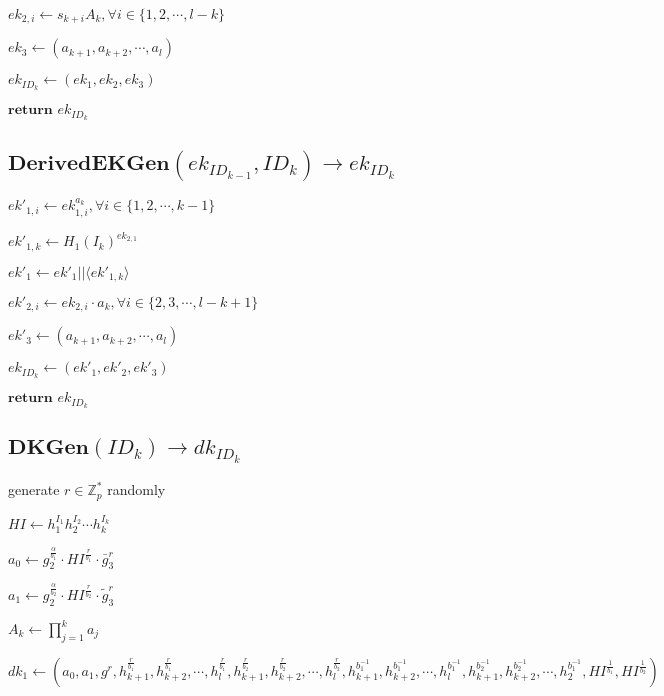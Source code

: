 \documentclass[a4paper]{article}
\begin{document}
$\textit{ek}_{2, i} \gets s_{k + i}A_k, \forall i \in \{1, 2, \cdots, l - k\}$

$\textit{ek}_3 \gets (a_{k + 1}, a_{k + 2}, \cdots, a_l)$

$\textit{ek}_{\textit{ID}_k} \gets (\textit{ek}_1, \textit{ek}_2, \textit{ek}_3)$

$\textbf{return }\textit{ek}_{\textit{ID}_k}$

\subsection{$\textbf{DerivedEKGen}(\textit{ek}_{\textit{ID}_{k - 1}}, \textit{ID}_k) \rightarrow \textit{ek}_{\textit{ID}_k}$}

$\textit{ek}'_{1, i} \gets \textit{ek}_{1, i}^{a_k}, \forall i \in \{1, 2, \cdots, k - 1\}$

$\textit{ek}'_{1, k} \gets H_1(I_k)^{\textit{ek}_{2, 1}}$

$\textit{ek}'_1 \gets \textit{ek}'_1 || \langle\textit{ek}'_{1, k}\rangle$

$\textit{ek}'_{2, i} \gets \textit{ek}_{2, i} \cdot a_k, \forall i \in \{2, 3, \cdots, l - k + 1\}$

$\textit{ek}'_3 \gets (a_{k + 1}, a_{k + 2}, \cdots, a_l)$

$\textit{ek}_{\textit{ID}_k} \gets (\textit{ek}'_1, \textit{ek}'_2, \textit{ek}'_3)$

$\textbf{return }\textit{ek}_{\textit{ID}_k}$

\subsection{$\textbf{DKGen}(\textit{ID}_k) \rightarrow \textit{dk}_{\textit{ID}_k}$}

generate $r \in \mathbb{Z}_p^*$ randomly

$\textit{HI} \gets h_1^{I_1} h_2^{I_2} \cdots h_k^{I_k}$

$a_0 \gets g_2^{\frac{\alpha}{b_1}} \cdot \textit{HI}^{\frac{r}{b_1}} \cdot \bar{g}_3^r$

$a_1 \gets g_2^{\frac{\alpha}{b_2}} \cdot \textit{HI}^{\frac{r}{b_2}} \cdot \tilde{g}_3^r$

$A_k \gets \prod\limits_{j = 1}^k a_j$

$\textit{dk}_1 \gets (
a_0, a_1, g^r,\allowbreak
h_{k + 1}^{\frac{r}{b_1}}, h_{k + 2}^{\frac{r}{b_1}}, \cdots, h_l^{\frac{r}{b_1}},\allowbreak
h_{k + 1}^{\frac{r}{b_2}}, h_{k + 2}^{\frac{r}{b_2}}, \cdots, h_l^{\frac{r}{b_2}},\allowbreak
h_{k + 1}^{b_1^{-1}}, h_{k + 2}^{b_1^{-1}}, \cdots, h_l^{b_1^{-1}},\allowbreak
h_{k + 1}^{b_2^{-1}}, h_{k + 2}^{b_2^{-1}}, \cdots, h_2^{b_1^{-1}},\allowbreak
\textit{HI}^{\frac{1}{b_1}}, \textit{HI}^{\frac{1}{b_2}}
)$
\end{document}

